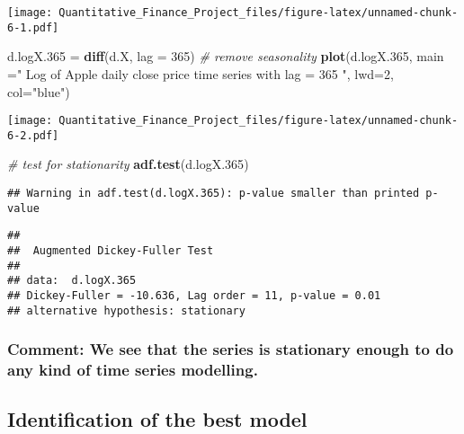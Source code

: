 \documentclass[
]{article}
\newenvironment{Shaded}{\begin{snugshade}}{\end{snugshade}}
\newcommand{\AttributeTok}[1]{\textcolor[rgb]{0.13,0.29,0.53}{#1}}
\newcommand{\CommentTok}[1]{\textcolor[rgb]{0.56,0.35,0.01}{\textit{#1}}}
\newcommand{\DecValTok}[1]{\textcolor[rgb]{0.00,0.00,0.81}{#1}}
\newcommand{\FloatTok}[1]{\textcolor[rgb]{0.00,0.00,0.81}{#1}}
\newcommand{\FunctionTok}[1]{\textcolor[rgb]{0.13,0.29,0.53}{\textbf{#1}}}
\newcommand{\NormalTok}[1]{#1}
\newcommand{\OtherTok}[1]{\textcolor[rgb]{0.56,0.35,0.01}{#1}}
\newcommand{\StringTok}[1]{\textcolor[rgb]{0.31,0.60,0.02}{#1}}
\begin{document}
\texttt{[image: Quantitative\_Finance\_Project\_files/figure-latex/unnamed-chunk-6-1.pdf]}

\begin{Shaded}
\begin{Highlighting}[]
\NormalTok{d.logX}\FloatTok{.365} \OtherTok{=} \FunctionTok{diff}\NormalTok{(d.X, }\AttributeTok{lag =} \DecValTok{365}\NormalTok{)  }\CommentTok{\# remove seasonality}
\FunctionTok{plot}\NormalTok{(d.logX}\FloatTok{.365}\NormalTok{, }\AttributeTok{main =}\StringTok{" Log of Apple daily close price time series with lag = 365 "}\NormalTok{, }\AttributeTok{lwd=}\DecValTok{2}\NormalTok{, }\AttributeTok{col=}\StringTok{"blue"}\NormalTok{)}
\end{Highlighting}
\end{Shaded}

\texttt{[image: Quantitative\_Finance\_Project\_files/figure-latex/unnamed-chunk-6-2.pdf]}

\begin{Shaded}
\begin{Highlighting}[]
\CommentTok{\# test for stationarity}
\FunctionTok{adf.test}\NormalTok{(d.logX}\FloatTok{.365}\NormalTok{)}
\end{Highlighting}
\end{Shaded}

\begin{verbatim}
## Warning in adf.test(d.logX.365): p-value smaller than printed p-value
\end{verbatim}

\begin{verbatim}
## 
##  Augmented Dickey-Fuller Test
## 
## data:  d.logX.365
## Dickey-Fuller = -10.636, Lag order = 11, p-value = 0.01
## alternative hypothesis: stationary
\end{verbatim}

\hypertarget{comment-we-see-that-the-series-is-stationary-enough-to-do-any-kind-of-time-series-modelling.}{%
\subsubsection{Comment: We see that the series is stationary enough to
do any kind of time series
modelling.}\label{comment-we-see-that-the-series-is-stationary-enough-to-do-any-kind-of-time-series-modelling.}}

\hypertarget{identification-of-the-best-model}{%
\subsection{Identification of the best
model}\label{identification-of-the-best-model}}
\end{document}
